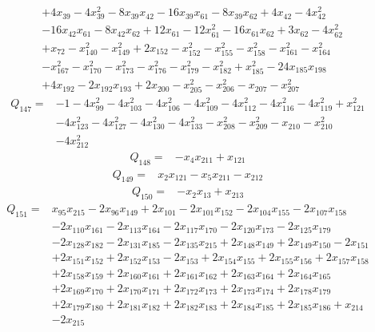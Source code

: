 \begin{equation*}
\begin{aligned}
& +4x_{39}-4x_{39}^{2}-8x_{39}x_{42}-16x_{39}x_{61}-8x_{39}x_{62}+4x_{42}-4x_{42}^{2}\\
& -16x_{42}x_{61}-8x_{42}x_{62}+12x_{61}-12x_{61}^{2}-16x_{61}x_{62}+3x_{62}-4x_{62}^{2}\\
& +x_{72}-x_{140}^{2}-x_{149}^{2}+2x_{152}-x_{152}^{2}-x_{155}^{2}-x_{158}^{2}-x_{161}^{2}-x_{164}^{2}\\
& -x_{167}^{2}-x_{170}^{2}-x_{173}^{2}-x_{176}^{2}-x_{179}^{2}-x_{182}^{2}+x_{185}^{2}-24x_{185}x_{198}\\
& +4x_{192}-2x_{192}x_{193}+2x_{200}-x_{205}^{2}-x_{206}^{2}-x_{207}-x_{207}^{2}
\end{aligned}\end{equation*}
\begin{equation*}\begin{aligned}
Q_{147}={}& -1-4x_{99}^{2}-4x_{103}^{2}-4x_{106}^{2}-4x_{109}^{2}-4x_{112}^{2}-4x_{116}^{2}-4x_{119}^{2}+x_{121}^{2}\\
& -4x_{123}^{2}-4x_{127}^{2}-4x_{130}^{2}-4x_{133}^{2}-x_{208}^{2}-x_{209}^{2}-x_{210}-x_{210}^{2}\\
& -4x_{212}^{2}
\end{aligned}\end{equation*}
\begin{equation*}\begin{aligned}
Q_{148}={}& -x_{4}x_{211}+x_{121}
\end{aligned}\end{equation*}
\begin{equation*}\begin{aligned}
Q_{149}={}& x_{2}x_{121}-x_{5}x_{211}-x_{212}
\end{aligned}\end{equation*}
\begin{equation*}\begin{aligned}
Q_{150}={}& -x_{2}x_{13}+x_{213}
\end{aligned}\end{equation*}
\begin{equation*}\begin{aligned}
Q_{151}={}& x_{95}x_{215}-2x_{96}x_{149}+2x_{101}-2x_{101}x_{152}-2x_{104}x_{155}-2x_{107}x_{158}\\
& -2x_{110}x_{161}-2x_{113}x_{164}-2x_{117}x_{170}-2x_{120}x_{173}-2x_{125}x_{179}\\
& -2x_{128}x_{182}-2x_{131}x_{185}-2x_{135}x_{215}+2x_{148}x_{149}+2x_{149}x_{150}-2x_{151}\\
& +2x_{151}x_{152}+2x_{152}x_{153}-2x_{153}+2x_{154}x_{155}+2x_{155}x_{156}+2x_{157}x_{158}\\
& +2x_{158}x_{159}+2x_{160}x_{161}+2x_{161}x_{162}+2x_{163}x_{164}+2x_{164}x_{165}\\
& +2x_{169}x_{170}+2x_{170}x_{171}+2x_{172}x_{173}+2x_{173}x_{174}+2x_{178}x_{179}\\
& +2x_{179}x_{180}+2x_{181}x_{182}+2x_{182}x_{183}+2x_{184}x_{185}+2x_{185}x_{186}+x_{214}\\
& -2x_{215}
\end{aligned}\end{equation*}
